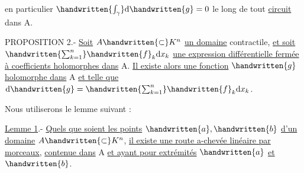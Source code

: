 en particulier $\handwritten{\int_\gamma}\mathrm{d}\handwritten{g}=0$ le long de tout \uline{circuit} dans A.

PROPOSITION 2.- \uline{Soit} $A\handwritten{\subset}K^n$ \uline{un domaine} contractile, \uline{et soit} $\handwritten{\sum_{k=1}^n}\handwritten{f}_k\mathrm{d}x_k$ \uline{une expression différentielle fermée à coefficients holomorphes dans} A. \uline{Il existe alors une fonction} $\handwritten{g}$ \uline{holomorphe dans} A \uline{et telle que} $\mathrm{d}\handwritten{g}=\handwritten{\sum_{k=1}^n}\handwritten{f}_k\mathrm{d}x_k$.

Nous utiliserons le lemme suivant :

\uline{Lemme 1}.- \uline{Quels que soient les points} $\handwritten{a},\handwritten{b}$ \uline{d'un domaine} $A\handwritten{\subset}K^n$, \uline{il existe une route a-chevée linéaire par morceaux}, \uline{contenue dans} A \uline{et ayant pour extrémités} $\handwritten{a}$ \uline{et} $\handwritten{b}$.

